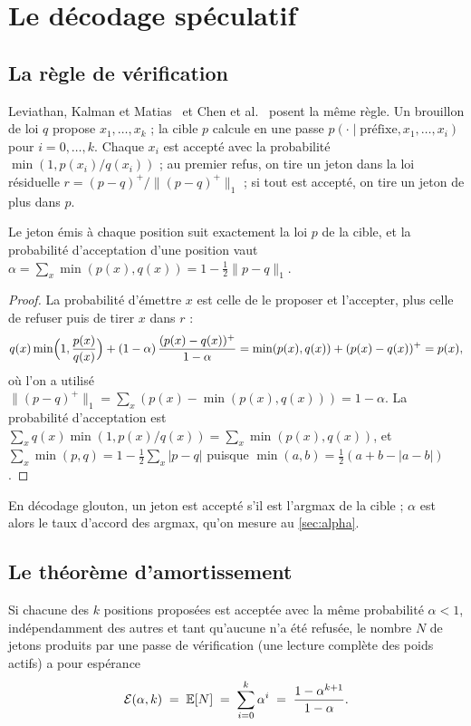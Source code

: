 \section{Le décodage spéculatif}\label{sec:speculatif}

\subsection{La règle de vérification}

Leviathan, Kalman et Matias~\cite{leviathan2023} et Chen et al.~\cite{chen2023spec} posent la même règle. Un brouillon de loi $q$ propose $x_1, \dots, x_k$ ; la cible $p$ calcule en une passe $p(\cdot \mid \text{préfixe}, x_1, \dots, x_i)$ pour $i = 0, \dots, k$. Chaque $x_i$ est accepté avec la probabilité $\min(1, p(x_i)/q(x_i))$ ; au premier refus, on tire un jeton dans la loi résiduelle $r = (p - q)^+ / \lVert (p - q)^+ \rVert_1$ ; si tout est accepté, on tire un jeton de plus dans $p$.

\begin{proposition}\label{prop:exacte}
Le jeton émis à chaque position suit exactement la loi $p$ de la cible, et la probabilité d'acceptation d'une position vaut $\alpha = \sum_x \min(p(x), q(x)) = 1 - \tfrac12 \lVert p - q \rVert_1$.
\end{proposition}

\begin{proof}
La probabilité d'émettre $x$ est celle de le proposer et l'accepter, plus celle de refuser puis de tirer $x$ dans $r$ :
\[
q(x) \min\Bigl(1, \frac{p(x)}{q(x)}\Bigr) + (1-\alpha)\, \frac{(p(x) - q(x))^+}{1 - \alpha} = \min(p(x), q(x)) + (p(x) - q(x))^+ = p(x),
\]
où l'on a utilisé $\lVert (p-q)^+ \rVert_1 = \sum_x (p(x) - \min(p(x),q(x))) = 1 - \alpha$. La probabilité d'acceptation est $\sum_x q(x)\min(1, p(x)/q(x)) = \sum_x \min(p(x), q(x))$, et $\sum_x \min(p,q) = 1 - \tfrac12 \sum_x |p - q|$ puisque $\min(a,b) = \tfrac12(a + b - |a-b|)$.
\end{proof}

En décodage glouton, un jeton est accepté s'il est l'argmax de la cible ; $\alpha$ est alors le taux d'accord des argmax, qu'on mesure au \cref{sec:alpha}.

\subsection{Le théorème d'amortissement}

\begin{theoreme}\label{thm:amortissement}
Si chacune des $k$ positions proposées est acceptée avec la même probabilité $\alpha < 1$, indépendamment des autres et tant qu'aucune n'a été refusée, le nombre $N$ de jetons produits par une passe de vérification (une lecture complète des poids actifs) a pour espérance
\begin{equation}\label{eq:amortissement}
\mathcal E(\alpha, k) \;=\; \mathbb{E}[N] \;=\; \sum_{i=0}^{k} \alpha^i \;=\; \frac{1 - \alpha^{k+1}}{1 - \alpha}.
\end{equation}
\end{theoreme}

